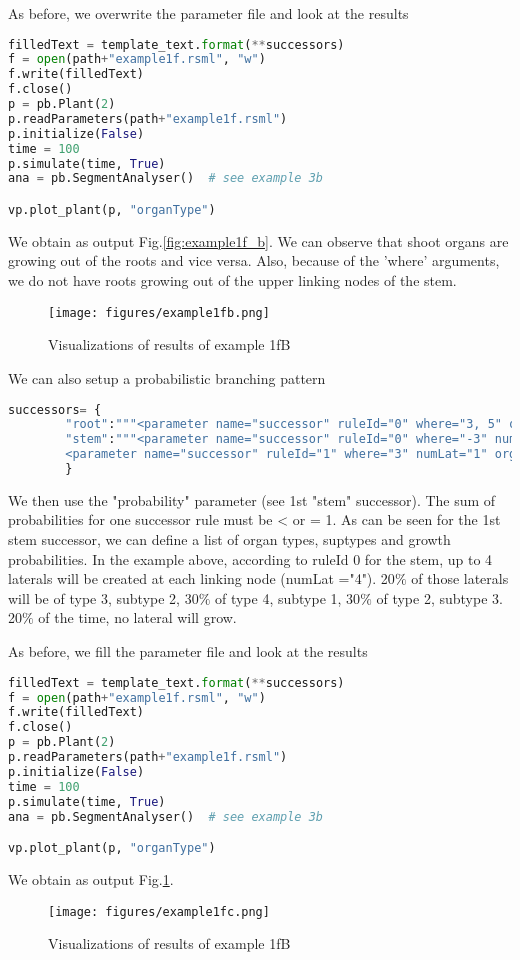 As before, we overwrite the parameter file and look at the results
\begin{lstlisting}[language=Python]
filledText = template_text.format(**successors)
f = open(path+"example1f.rsml", "w")
f.write(filledText)
f.close()
p = pb.Plant(2)
p.readParameters(path+"example1f.rsml")  
p.initialize(False)
time = 100
p.simulate(time, True)
ana = pb.SegmentAnalyser()  # see example 3b

vp.plot_plant(p, "organType")
\end{lstlisting}


We obtain as output  Fig.\ref{fig:example1f_b}. We can observe that shoot organs are growing out of the roots and vice versa. Also, because of the 'where' arguments, we do not have roots growing out of the upper linking nodes of the stem.

\begin{figure}
\texttt{[image: figures/example1fb.png]}
\caption{Visualizations of results of example 1fB} 
\end{figure}

We can also setup a probabilistic branching pattern
\begin{lstlisting}[language=Python]
successors= {
        "root":"""<parameter name="successor" ruleId="0" where="3, 5" organType="2" subtype="2" probability="1"/>""",
        "stem":"""<parameter name="successor" ruleId="0" where="-3" numLat="4" organType="3,4,2" subtype="2,1,3" probability="0.2,0.3,0.3"/>
        <parameter name="successor" ruleId="1" where="3" numLat="1" organType="3" subtype="2" probability="1"/>"""
        }
\end{lstlisting}
We then use the "probability" parameter (see 1st "stem" successor).
The sum of probabilities for one successor rule must be < or = 1. As can be seen for the 1st stem successor, we can define a list of organ types, suptypes and growth probabilities. In the example above, according to ruleId 0 for the stem, up to 4 laterals will be created at each linking node (numLat ="4"). 20$\%$ of those laterals will be of type 3, subtype 2, 30$\%$ of type 4, subtype 1, 30$\%$ of type 2, subtype 3. 20$\%$ of the time, no lateral will grow.

As before, we fill the parameter file and look at the results
\begin{lstlisting}[language=Python]
filledText = template_text.format(**successors)
f = open(path+"example1f.rsml", "w")
f.write(filledText)
f.close()
p = pb.Plant(2)
p.readParameters(path+"example1f.rsml")  
p.initialize(False)
time = 100
p.simulate(time, True)
ana = pb.SegmentAnalyser()  # see example 3b

vp.plot_plant(p, "organType")
\end{lstlisting}


We obtain as output Fig.\ref{fig:example1f_c}.

\begin{figure}\label{fig:example1f_c}
\texttt{[image: figures/example1fc.png]}
\caption{Visualizations of results of example 1fB} 
\end{figure}
